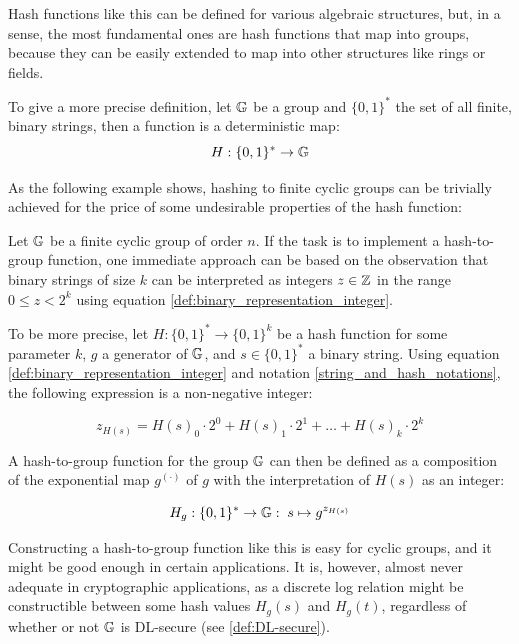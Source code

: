 Hash functions like this can be defined for various algebraic structures, but, in a sense, the most fundamental ones are hash functions that map into groups, because they can be easily extended to map into other structures like rings or fields.

To give a more precise definition, let $\mathbb{G}$ be a group and $\{0,1\}^*$ the set of all finite, binary strings, then a  function is a deterministic map:
\begin{equation}
H : \{0,1\}^* \to \mathbb{G}
\end{equation}

As the following example shows, hashing to finite cyclic groups can be trivially achieved for the price of some undesirable properties of the hash function:

\begin{example}\label{naive-cyclic-group-hash} Let $\mathbb{G}$ be a finite cyclic group of order $n$. If the task is to implement a hash-to-group function, one immediate approach can be based on the observation that binary strings of size $k$ can be interpreted as integers $z\in\mathbb{Z}$ in the range $0\leq z < 2^k$ using equation \ref{def:binary_representation_integer}.

To be more precise, let $H:\{0,1\}^*\to \{0,1\}^k$ be a hash function for some parameter $k$, $g$ a generator of $\mathbb{G}$, and $s\in\{0,1\}^*$ a binary string. Using equation \ref{def:binary_representation_integer} and notation \ref{string_and_hash_notations}, the following expression is a non-negative integer:

\begin{equation}
z_{H(s)}= H(s)_0\cdot 2^0 + H(s)_1\cdot 2^1 + \ldots + H(s)_k \cdot 2^k
\end{equation}

A hash-to-group function for the group $\mathbb{G}$ can then be defined as a composition of the exponential map $g^{(\cdot)}$ of $g$ with the interpretation of $H(s)$ as an integer:

\begin{equation}
H_{g} : \{0,1\}^* \to \mathbb{G}:\; s \mapsto g^{z_{H(s)}}
\end{equation}

Constructing a hash-to-group function like this is easy for cyclic groups, and it might be good enough in certain applications. It is, however, almost never adequate in cryptographic applications, as a discrete log relation might be constructible between some hash values $H_g(s)$ and $H_g(t)$, regardless of whether or not $\mathbb{G}$ is DL-secure (see \secname \ref{def:DL-secure}).


\end{example}
